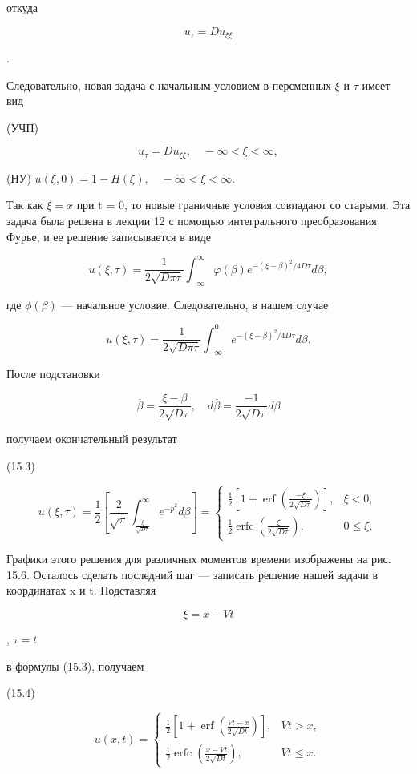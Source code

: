 \documentclass[
  ukrainian,
]{article}
\begin{document}
откуда

\[
u_{\tau} = Du_{\xi\xi}
\]

.

Следовательно, новая задача с начальным условием в персменных \(\xi\) и
\(\tau\) имеет вид

(УЧП)

\[
u_{\tau} = Du_{\xi\xi}, \quad -\infty < \xi < \infty,
\]

(НУ) \(u(\xi, 0) = 1 - H(\xi), \quad -\infty < \xi < \infty.\)

Так как \(\xi = x\) при t = 0, то новые граничные условия совпадают со
старыми. Эта задача была решена в лекции 12 с помощью интегрального
преобразования Фурье, и ее решение записывается в виде

\[
u(\xi, \tau) = \frac{1}{2\sqrt{D\pi\tau}} \int_{-\infty}^{\infty} \varphi(\beta) e^{-(\xi-\beta)^2/4D\tau} d\beta,
\]

где \(\phi(\beta)\) --- начальное условие. Следовательно, в нашем случае

\[
u(\xi, \tau) = \frac{1}{2\sqrt{D\pi\tau}} \int_{-\infty}^{0} e^{-(\xi-\beta)^2/4D\tau} d\beta.
\]

После подстановки

\[
\overline{\beta} = \frac{\xi - \beta}{2\sqrt{D\tau}}, \quad d\overline{\beta} = \frac{-1}{2\sqrt{D\tau}}d\beta
\]

получаем окончательный результат

(15.3)

\[
u(\xi, \tau) = \frac{1}{2} \left[ \frac{2}{\sqrt{\pi}} \int_{\frac{\xi}{\sqrt{D\tau}}}^{\infty} e^{-\overline{p}^{2}} d\overline{\beta} \right] = \begin{cases} \frac{1}{2} \left[ 1 + \operatorname{erf} \left( \frac{-\xi}{2\sqrt{D\tau}} \right) \right], & \xi < 0, \\ \frac{1}{2} \operatorname{erfc} \left( \frac{\xi}{2\sqrt{D\tau}} \right), & 0 \leq \xi. \end{cases}
\]

Графики этого решения для различных моментов времени изображены на рис.
15.6. Осталось сделать последний шаг --- записать решение нашей задачи в
координатах x и t. Подставляя

\[
\xi = x - Vt
\]

, \(\tau = t\)

в формулы (15.3), получаем

(15.4)

\[
u(x, t) = \begin{cases} \frac{1}{2} \left[ 1 + \operatorname{erf}\left(\frac{Vt - x}{2\sqrt{Dt}}\right) \right], & Vt > x, \\ \frac{1}{2} \operatorname{erfc}\left(\frac{x - Vt}{2\sqrt{Dt}}\right), & Vt \leq x. \end{cases}
\]
\end{document}
